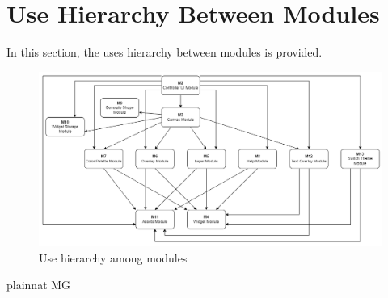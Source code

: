 \documentclass[12pt, titlepage]{article}
\newcounter{mnum}
\newcommand{\mthemnum}{M\themnum}
\begin{document}


\section{Use Hierarchy Between Modules} \label{SecUse}

In this section, the uses hierarchy between modules is
provided.

\begin{figure}[H]
\centering
\includegraphics[width=\textwidth]{images/UsesHierarchyVer2.png}
\caption{Use hierarchy among modules}
\label{FigUH}
\end{figure}


 {plainnat}
 {MG}
\end{document}
